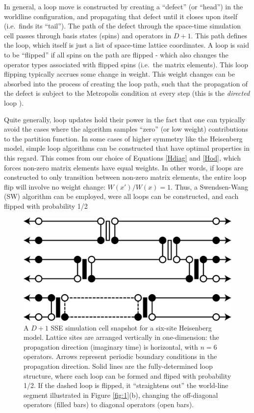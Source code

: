 \documentclass[vecphys]{svmult}
\begin{document}
In general, a loop move is constructed by creating a ``defect'' (or ``head'') in the worldline configuration, and propagating that defect until it closes upon itself (i.e.~finds its ``tail'').  The path of the defect through the space-time simulation cell passes through basis states (spins) and operators in $D+1$.  This path defines the loop, which itself is just a list of space-time lattice coordinates.  A loop is said to be ``flipped'' if all spins on the path are flipped - which also changes the operator types associated with flipped spins (i.e.~the matrix elements).
This loop flipping typically accrues some change in weight.  This weight changes can be absorbed into the process of creating the loop path, such that the propagation of the defect is subject to the Metropolis condition at every step (this is the {\em directed} loop \cite{Melko:Syljuasen02}).  

Quite generally, loop updates hold their power in the fact that one can typically avoid the cases where the algorithm samples ``zero'' (or low weight) contributions to the partition function.  In some cases of higher symmetry like the Heisenberg model, simple loop algorithms can be constructed that have optimal properties in this regard.  This comes from our choice of Equations \ref{Hdiag} and \ref{Hod}, which forces non-zero matrix elements have equal weights.  In other words, if loops are constructed to only transition between non-zero matrix elements, the entire loop flip will involve no weight change: $W(x')/W(x) = 1$.  Thus, a Swendsen-Wang (SW) algorithm can be employed, were
all loops can be constructed, and each flipped with probability 1/2 \cite{Melko:Swendsen88}

\begin{figure}[t]
\centering
\includegraphics*[width=.9\textwidth]{finiteT_heis.eps}
\caption[]{A $D+1$ SSE simulation cell snapshot for a six-site Heisenberg model.  Lattice sites are arranged vertically in one-dimension: the propagation direction (imaginary time) is horizontal, with $n=6$ operators.  Arrows represent periodic boundary conditions in the propagation direction.  Solid lines are the fully-determined loop structure, where each loop can be formed and fliped with probability 1/2.  If the dashed loop is flipped, it ``straightens out'' the world-line segment illustrated in Figure \ref{fig:1}(b), changing the off-diagonal operators (filled bars) to diagonal operators (open bars).}
\label{fig:2}       %
\end{figure} 
\end{document}
